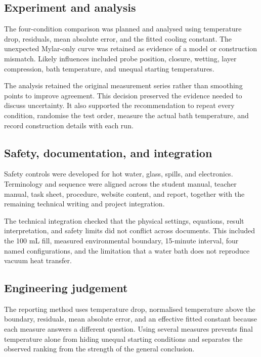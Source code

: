 \documentclass[10pt,conference,a4paper]{IEEEtran}
\begin{document}
\subsection*{Experiment and analysis}

The four-condition comparison was planned and analysed using temperature drop, residuals, mean absolute error, and the fitted cooling constant. The unexpected Mylar-only curve was retained as evidence of a model or construction mismatch. Likely influences included probe position, closure, wetting, layer compression, bath temperature, and unequal starting temperatures.

The analysis retained the original measurement series rather than smoothing points to improve agreement. This decision preserved the evidence needed to discuss uncertainty. It also supported the recommendation to repeat every condition, randomise the test order, measure the actual bath temperature, and record construction details with each run.

\subsection*{Safety, documentation, and integration}

Safety controls were developed for hot water, glass, spills, and electronics. Terminology and sequence were aligned across the student manual, teacher manual, task sheet, procedure, website content, and report, together with the remaining technical writing and project integration.

The technical integration checked that the physical settings, equations, result interpretation, and safety limits did not conflict across documents. This included the 100 mL fill, measured environmental boundary, 15-minute interval, four named configurations, and the limitation that a water bath does not reproduce vacuum heat transfer.

\subsection*{Engineering judgement}

The reporting method uses temperature drop, normalised temperature above the boundary, residuals, mean absolute error, and an effective fitted constant because each measure answers a different question. Using several measures prevents final temperature alone from hiding unequal starting conditions and separates the observed ranking from the strength of the general conclusion.
\end{document}
